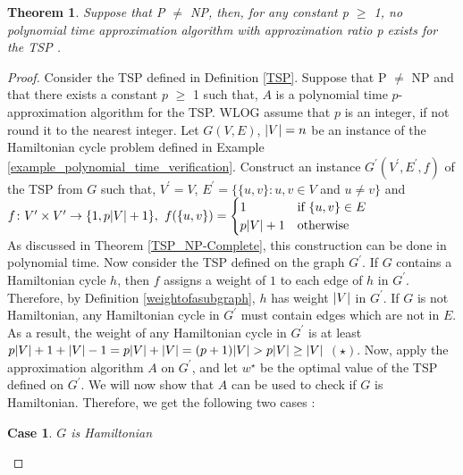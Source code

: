\documentclass{article}
\newtheorem{theorem}[definition]{Theorem}
\newtheorem{case}{Case}
\begin{document}
\begin{theorem}
Suppose that P $\neq$ NP, then, for any constant p $\geq$ 1, no polynomial time approximation algorithm with approximation ratio p exists for the TSP {}.
\label{no_approx_tsp}
\end{theorem}
\begin{proof}
Consider the TSP defined in Definition \ref{TSP}. Suppose that P $\neq$ NP and that there exists a constant $p$ $\geq$ 1 such that, $A$ is a polynomial time $p$-approximation algorithm for the TSP. WLOG assume that $p$ is an integer, if not round it to the nearest integer. Let $G(V,E)$, $\abs{V} = n$ be an instance of the Hamiltonian cycle problem defined in Example \ref{example_polynomial_time_verification}. Construct an instance $G^\prime(V^\prime,E^\prime,f)$ of the TSP from $G$ such that, $V^\prime = V$, $E^\prime = \{ \{u, v\} : u, v \in V$ and $u \neq v\}$ and \\ 
$f\colon V^\prime \times V^\prime \to \{1, p\abs{V} + 1\},$ $f(\{u, v\}) = \begin{cases} 1& \text{if } \{u, v\} \in E\\ p\abs{V} + 1              & \text{otherwise} \end{cases}$\\
As discussed in Theorem \ref{TSP_NP-Complete}, this construction can be done in polynomial time. Now consider the TSP defined on the graph $G^\prime$. If $G$ contains a Hamiltonian cycle $h$, then $f$ assigns a weight of $1$ to each edge of $h$ in $G^\prime$. Therefore, by Definition \ref{weightofasubgraph}, $h$ has weight $\abs{V}$ in $G^\prime$. If $G$ is not Hamiltonian, any Hamiltonian cycle in $G^\prime$ must contain edges which are not in $E$. As a result, the weight of any Hamiltonian cycle in $G^\prime$ is at least $p\abs{V} + 1 + \abs{V} - 1 = p\abs{V} + \abs{V} = (p+1)\abs{V} > p\abs{V} \geq \abs{V}$ $(\star)$.  Now, apply the approximation algorithm $A$ on $G^\prime$, and let $w^\star$ be the optimal value of the TSP defined on $G^\prime$. We will now show that $A$ can be used to check if $G$ is Hamiltonian. Therefore, we get the following two cases : 
\begin{case}
\label{case1}
$G$ is Hamiltonian 
\end{case}

\end{proof}
\end{document}
